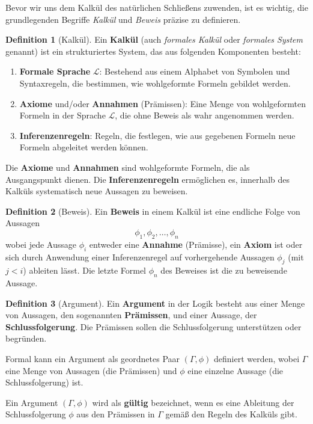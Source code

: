 \documentclass{book}
\theoremstyle{plain}
\theoremstyle{remark}
\theoremstyle{definition}
\newtheorem{definition}{Definition}[section]
\begin{document}
Bevor wir uns dem Kalkül des natürlichen Schließens zuwenden, ist es wichtig, die grundlegenden Begriffe \textit{Kalkül} und \textit{Beweis} präzise zu definieren.

\begin{definition}[Kalkül]
Ein \textbf{Kalkül} (auch \textit{formales Kalkül} oder \textit{formales System} genannt) ist ein strukturiertes System, das aus folgenden Komponenten besteht:

\begin{enumerate}
    \item \textbf{Formale Sprache} \(\mathcal{L}\): Bestehend aus einem Alphabet von Symbolen und Syntaxregeln, die bestimmen, wie wohlgeformte Formeln gebildet werden.
    \item \textbf{Axiome} und/oder \textbf{Annahmen} (Prämissen): Eine Menge von wohlgeformten Formeln in der Sprache \(\mathcal{L}\), die ohne Beweis als wahr angenommen werden.
    \item \textbf{Inferenzenregeln}: Regeln, die festlegen, wie aus gegebenen Formeln neue Formeln abgeleitet werden können.
\end{enumerate}

Die \textbf{Axiome} und \textbf{Annahmen} sind wohlgeformte Formeln, die als Ausgangspunkt dienen. Die \textbf{Inferenzenregeln} ermöglichen es, innerhalb des Kalküls systematisch neue Aussagen zu beweisen.
\end{definition}

\begin{definition}[Beweis]
Ein \textbf{Beweis} in einem Kalkül ist eine endliche Folge von Aussagen
\[
\phi_1, \phi_2, \ldots, \phi_n
\]
wobei jede Aussage \(\phi_i\) entweder eine \textbf{Annahme} (Prämisse), ein \textbf{Axiom} ist oder sich durch Anwendung einer Inferenzenregel auf vorhergehende Aussagen \(\phi_{j}\) (mit \(j < i\)) ableiten lässt. Die letzte Formel \(\phi_n\) des Beweises ist die zu beweisende Aussage.
\end{definition}

\begin{definition}[Argument]
Ein \textbf{Argument} in der Logik besteht aus einer Menge von Aussagen, den sogenannten \textbf{Prämissen}, und einer Aussage, der \textbf{Schlussfolgerung}. Die Prämissen sollen die Schlussfolgerung unterstützen oder begründen.

Formal kann ein Argument als geordnetes Paar \((\Gamma, \phi)\) definiert werden, wobei \(\Gamma\) eine Menge von Aussagen (die Prämissen) und \(\phi\) eine einzelne Aussage (die Schlussfolgerung) ist.

Ein Argument \((\Gamma, \phi)\) wird als \textbf{gültig} bezeichnet, wenn es eine Ableitung der Schlussfolgerung \(\phi\) aus den Prämissen in \(\Gamma\) gemäß den Regeln des Kalküls gibt.
\end{definition}
\end{document}
